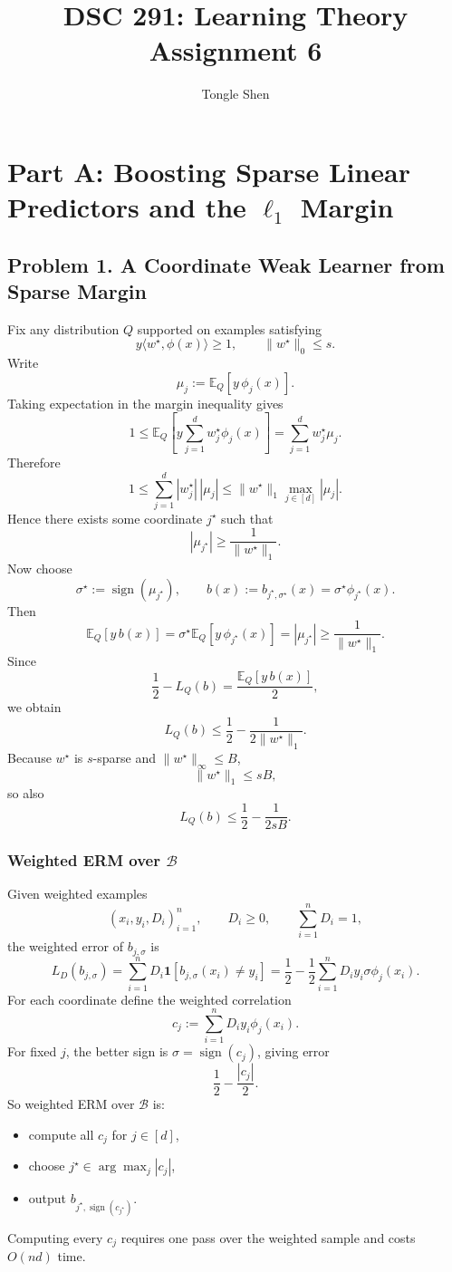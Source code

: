 \documentclass{article}
\title{DSC 291: Learning Theory Assignment 6}
\author{Tongle Shen}
\DeclareMathOperator{\sign}{sign}
\newcommand{\EE}{\mathbb{E}}
\newcommand{\cB}{\mathcal{B}}
\newcommand{\one}{\mathbf{1}}
\begin{document}
\maketitle

\section{\texorpdfstring{Part A: Boosting Sparse Linear Predictors and the $\ell_1$ Margin}{Part A: Boosting Sparse Linear Predictors and the l1 Margin}}

\subsection{Problem 1. A Coordinate Weak Learner from Sparse Margin}

Fix any distribution $Q$ supported on examples satisfying
$$
y\langle w^\star,\phi(x)\rangle \ge 1,
\qquad
\|w^\star\|_0 \le s.
$$
Write
$$
\mu_j := \EE_Q[y\,\phi_j(x)].
$$
Taking expectation in the margin inequality gives
$$
1
\le
\EE_Q\!\left[y\sum_{j=1}^d w_j^\star \phi_j(x)\right]
=
\sum_{j=1}^d w_j^\star \mu_j.
$$
Therefore
$$
1
\le
\sum_{j=1}^d |w_j^\star|\,|\mu_j|
\le
\|w^\star\|_1 \max_{j\in[d]} |\mu_j|.
$$
Hence there exists some coordinate $j^\star$ such that
$$
|\mu_{j^\star}|
\ge
\frac{1}{\|w^\star\|_1}.
$$
Now choose
$$
\sigma^\star := \sign(\mu_{j^\star}),
\qquad
b(x) := b_{j^\star,\sigma^\star}(x)=\sigma^\star \phi_{j^\star}(x).
$$
Then
$$
\EE_Q[y\,b(x)]
=
\sigma^\star \EE_Q[y\,\phi_{j^\star}(x)]
=
|\mu_{j^\star}|
\ge
\frac{1}{\|w^\star\|_1}.
$$
Since
$$
\frac12 - L_Q(b) = \frac{\EE_Q[y\,b(x)]}{2},
$$
we obtain
$$
L_Q(b)
\le
\frac12 - \frac{1}{2\|w^\star\|_1}.
$$
Because $w^\star$ is $s$-sparse and $\|w^\star\|_\infty \le B$,
$$
\|w^\star\|_1 \le sB,
$$
so also
$$
L_Q(b)
\le
\frac12 - \frac{1}{2sB}.
$$

\subsubsection{\texorpdfstring{Weighted ERM over $\cB$}{Weighted ERM over B}}

Given weighted examples
$$
(x_i,y_i,D_i)_{i=1}^n,
\qquad
D_i \ge 0,
\qquad
\sum_{i=1}^n D_i = 1,
$$
the weighted error of $b_{j,\sigma}$ is
$$
L_D(b_{j,\sigma})
=
\sum_{i=1}^n D_i \one[b_{j,\sigma}(x_i)\ne y_i]
=
\frac12 - \frac12 \sum_{i=1}^n D_i y_i \sigma \phi_j(x_i).
$$
For each coordinate define the weighted correlation
$$
c_j := \sum_{i=1}^n D_i y_i \phi_j(x_i).
$$
For fixed $j$, the better sign is $\sigma=\sign(c_j)$, giving error
$$
\frac12 - \frac{|c_j|}{2}.
$$
So weighted ERM over $\cB$ is:
\begin{itemize}
\item compute all $c_j$ for $j\in[d]$,
\item choose $j^\star\in\arg\max_j |c_j|$,
\item output $b_{j^\star,\sign(c_{j^\star})}$.
\end{itemize}
Computing every $c_j$ requires one pass over the weighted sample and costs $O(nd)$ time.
\end{document}
